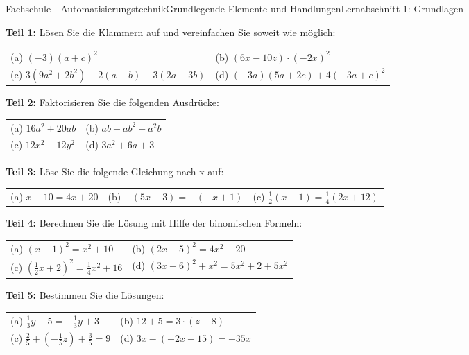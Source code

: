 \documentclass[oneside,openany,headings=optiontotoc,11pt,numbers=noenddot]{scrreprt}
\begin{document}
	\begin{worksheet}{Fachschule - Automatisierungstechnik}{Grundlegende Elemente und Handlungen}{Lernabschnitt 1: Grundlagen}
		\noindent	
		\begin{framed}
			\noindent
			\textbf{Teil 1:} Lösen Sie die Klammern auf und vereinfachen Sie soweit wie möglich:\\
			\begin{tabularx}{\textwidth}{XX}
				(a) \((-3)(a+c)^2\) & (b) \((6x-10z)\cdot{}(-2x)^2\)\\
				(c) \(3(9a^2+2b^2)+2(a-b)-3(2a-3b)\) & (d) \((-3a)(5a+2c) + 4(-3a+c)^2\)
			\end{tabularx}
		\end{framed}
		\begin{framed}
			\noindent
			\textbf{Teil 2:} Faktorisieren Sie die folgenden Ausdrücke:\\
			\begin{tabularx}{\textwidth}{XX}
				(a) \(16a^2 +20ab\) & (b) \(ab +ab^2+a^2b\)\\
				(c) \(12x^2-12y^2\) & (d) \(3a^2+6a+3\)
			\end{tabularx}
		\end{framed}
		\begin{framed}
			\noindent
			\textbf{Teil 3:} Löse Sie die folgende Gleichung nach x auf:\\
			\begin{tabularx}{\textwidth}{XXX}
				(a) \(x-10 = 4x+20\) & (b) \(-(5x-3) =-(-x+1)\) & (c) \(\frac{1}{2}(x-1) = \frac{1}{4}(2x+12)\)
			\end{tabularx}
		\end{framed}
		\begin{framed}
			\noindent
			\textbf{Teil 4:} Berechnen Sie die Lösung mit Hilfe der binomischen Formeln:\\
			\begin{tabularx}{\textwidth}{XX}
				(a) \((x+1)^2 = x^2 + 10\) & (b) \((2x-5)^2 = 4x^2 -20\)\\
				(c) \((\frac{1}{2}x + 2)^2 = \frac{1}{4}x^2 +16\) & (d) \((3x-6)^2 + x^2 = 5x^2 +2 +5x^2\)
			\end{tabularx}
		\end{framed}
		\begin{framed}
			\noindent
			\textbf{Teil 5:} Bestimmen Sie die Lösungen:\\
			\begin{tabularx}{\textwidth}{XX}
				(a) \(\frac{1}{3}y -5 = -\frac{1}{3}y + 3\) & (b) \(12 +5 = 3\cdot{}(z-8)\)\\
				(c) \(\frac{2}{5}+(-\frac{1}{5}z) + \frac{3}{5} = 9\) & (d) \(3x -(-2x+15) = -35x\)
			\end{tabularx}
		\end{framed}
	\end{worksheet}
\end{document}
